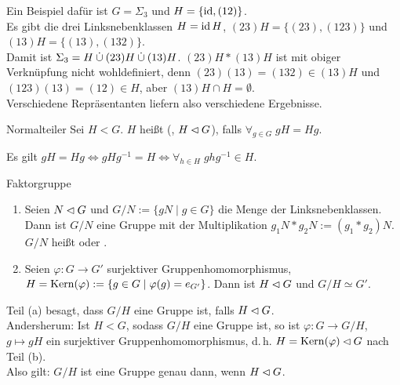 \begin{Bsp}
    Ein Beispiel dafür ist $G = \Sigma_3$ und $H = \{\operatorname{id}, (1 2)\}$.\\
    Es gibt die drei Linksnebenklassen
    $H = \operatorname{id} H$,
    $(2 3)H = \{(2 3), (1 2 3)\}$ und
    $(1 3)H = \{(1 3), (1 3 2)\}$.\\
    Damit ist $\Sigma_3 = H \mathbin{\dot{\cup}} (2 3)H \mathbin{\dot{\cup}} (1 3)H$.
    $(23)H \ast (13)H$ ist mit obiger Verknüpfung nicht wohl\-definiert, denn
    $(23)(13) = (132) \in (13)H$ und
    $(123)(13) = (12) \in H$, aber $(13)H \cap H = \emptyset$.\\
    Verschiedene Repräsentanten liefern also verschiedene Ergebnisse.
\end{Bsp}

\linie

\begin{Def}{Normalteiler}
    Sei $H < G$.
    $H$ heißt  (, $H \mathbin{\vartriangleleft} G$), falls
    $\forall_{g \in G}\; gH = Hg$.
\end{Def}

\begin{Bem}
    Es gilt
    $gH = Hg \iff gHg^{-1} = H \iff \forall_{h \in H}\; ghg^{-1} \in H$.
\end{Bem}

\begin{Prop}{Faktorgruppe}
    \begin{enumerate}[label=(\alph*)]
        \item
        Seien $N \mathbin{\vartriangleleft} G$ und $G/N := \{gN \;|\; g \in G\}$
        die Menge der Linksnebenklassen.\\
        Dann ist $G/N$ eine Gruppe mit der Multiplikation
        $g_1 N \ast g_2 N := (g_1 \ast g_2) N$.\\
        $G/N$ heißt  oder .

        \item
        Seien $\varphi\colon G \rightarrow G'$ surjektiver
        Gruppenhomomorphismus,\\
        $H = \operatorname{Kern}(\varphi) :=
        \{g \in G \;|\; \varphi(g) = e_{G'}\}$.
        Dann ist $H \mathbin{\vartriangleleft} G$ und $G/H \simeq G'$.
    \end{enumerate}
\end{Prop}

\begin{Bem}
    Teil (a) besagt, dass $G/H$ eine Gruppe ist, falls $H \mathbin{\vartriangleleft} G$.\\
    Andersherum: Ist $H < G$, sodass $G/H$ eine Gruppe ist, so ist
    $\varphi\colon G \rightarrow G/H$, $g \mapsto gH$ ein surjektiver
    Gruppenhomomorphismus, d.\,h. $H = \operatorname{Kern}(\varphi) \mathbin{\vartriangleleft} G$ nach Teil (b).\\
    Also gilt: $G/H$ ist eine Gruppe genau dann, wenn $H \mathbin{\vartriangleleft} G$.
\end{Bem}

